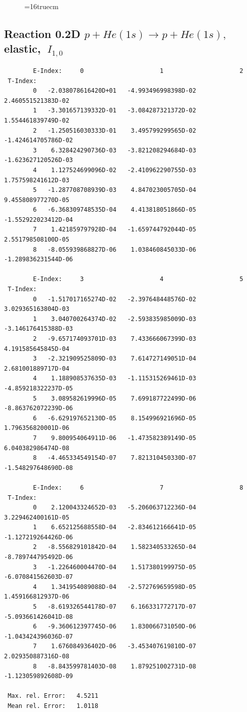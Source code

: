 \documentclass[12pt,dvips]{article}
\begin{document}
\begin{figure} \label{0.2T}
\epsfxsize=16truecm
\end{figure}
\newpage

\subsection{
Reaction 0.2D $ p + He(1s) \rightarrow p + He(1s) ,\  $
elastic, $ \  I_{1,0} $
}

\begin{small}\begin{verbatim}
        E-Index:     0                     1                     2
 T-Index:
        0   -2.038078616420D+01   -4.993496998398D-02    2.460551521383D-02
        1   -3.301657139332D-01   -3.084287321372D-02    1.554461839749D-02
        2   -1.250516030333D-01    3.495799299565D-02   -1.424614705786D-02
        3    6.328424290736D-03   -3.821208294684D-03   -1.623627120526D-03
        4    1.127524699096D-02   -2.410962290755D-03    1.757598241612D-03
        5   -1.287708708939D-03    4.847023005705D-04    9.455808977270D-05
        6   -6.368309748535D-04    4.413818051866D-05   -1.552922023412D-04
        7    1.421859797928D-04   -1.659744792044D-05    2.551798508100D-05
        8   -8.055939868827D-06    1.038460845033D-06   -1.289836231544D-06

        E-Index:     3                     4                     5
 T-Index:
        0   -1.517017165274D-02   -2.397648448576D-02    3.029365163804D-03
        1    3.040700264374D-02   -2.593835985009D-03   -3.146176415388D-03
        2   -9.657174093701D-03    7.433666067399D-03    4.191585645845D-04
        3   -2.321909525809D-03    7.614727149051D-04    2.681001889717D-04
        4    1.188908537635D-03   -1.115315269461D-03   -4.859218322237D-05
        5    3.089582619996D-05    7.699187722499D-06   -8.863762072239D-06
        6   -6.629197652130D-05    8.154996921696D-05    1.796356820001D-06
        7    9.800954064911D-06   -1.473582389149D-05    6.040382986474D-08
        8   -4.465334549154D-07    7.821310450330D-07   -1.548297648690D-08

        E-Index:     6                     7                     8
 T-Index:
        0    2.120043324652D-03   -5.206063712236D-04    3.229462400161D-05
        1    6.652125688558D-04   -2.834612166641D-05   -1.127219264426D-06
        2   -8.556829101842D-04    1.582340533265D-04   -8.789744795492D-06
        3   -1.226460004470D-04    1.517380199975D-05   -6.070841562603D-07
        4    1.341954089088D-04   -2.572769659598D-05    1.459166812937D-06
        5   -8.619326544178D-07    6.166331772717D-07   -5.093661426041D-08
        6   -9.360612397745D-06    1.830066731050D-06   -1.043424396036D-07
        7    1.676084936402D-06   -3.453407619810D-07    2.029350887316D-08
        8   -8.843599781403D-08    1.879251002731D-08   -1.123059892608D-09

 Max. rel. Error:   4.5211
 Mean rel. Error:   1.0118
\end{verbatim}\end{small}
\end{document}
